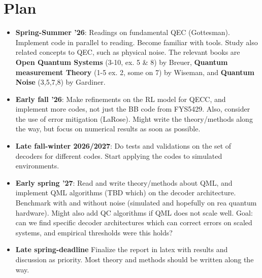 \documentclass{article}
\begin{document}
\section{Plan}
\begin{itemize}
    \item \textbf{Spring-Summer '26}: Readings on fundamental QEC (Gottesman). Implement code in parallel to reading. Become familiar with tools. Study also related concepts to QEC, such as physical noise. The relevant books are \textbf{Open Quantum Systems} (3-10, ex. 5 \& 8) by Breuer, \textbf{Quantum measurement Theory} (1-5 ex. 2, some on 7) by Wiseman, and \textbf{Quantum Noise} (3,5,7,8) by Gardiner.
    \item \textbf{Early fall '26}: Make refinements on the RL model for QECC, and implement more codes, not just the BB code from FYS5429. Also, consider the use of error mitigation (LaRose). Might write the theory/methods along the way, but focus on numerical results as soon as possible. 
    \item \textbf{Late fall-winter 2026/2027}: Do tests and validations on the set of decoders for different codes. Start applying the codes to simulated environments.
    \item \textbf{Early spring '27}: Read and write theory/methods about QML, and implement QML algorithms (TBD which) on the decoder architecture. Benchmark with and without noise (simulated and hopefully on rea quantum hardware). Might also add QC algorithms if QML does not scale well. Goal: can we find specific decoder architectures which can correct errors on scaled systems, and empirical thresholds were this holds?
    \item \textbf{Late spring-deadline} Finalize the report in latex with results and discussion as priority. Most theory and methods should be written along the way.
\end{itemize}
\end{document}
